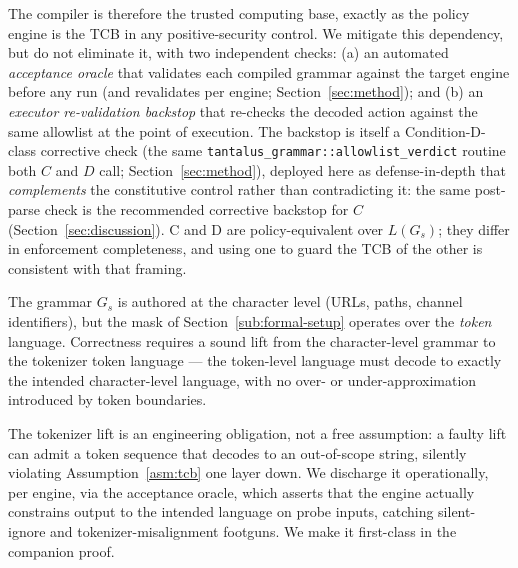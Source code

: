 The compiler is therefore the trusted computing base, exactly as the policy engine is the TCB in any positive-security control. We mitigate this dependency, but do not eliminate it, with two independent checks: (a) an automated \emph{acceptance oracle} that validates each compiled grammar against the target engine before any run (and revalidates per engine; Section~\ref{sec:method}); and (b) an \emph{executor re-validation backstop} that re-checks the decoded action against the same allowlist at the point of execution. The backstop is itself a Condition-D-class corrective check (the same \texttt{tantalus\_grammar::allowlist\_verdict} routine both \(C\) and \(D\) call; Section~\ref{sec:method}), deployed here as defense-in-depth that \emph{complements} the constitutive control rather than contradicting it: the same post-parse check is the recommended corrective backstop for \(C\) (Section~\ref{sec:discussion}). C and D are policy-equivalent over \(L(G_s)\); they differ in enforcement completeness, and using one to guard the TCB of the other is consistent with that framing.

\begin{assumption}
\label{asm:tokenizer-lift}
The grammar \(G_s\) is authored at the character level (URLs, paths, channel identifiers), but the mask of Section~\ref{sub:formal-setup} operates over the \emph{token} language. Correctness requires a sound lift from the character-level grammar to the tokenizer token language --- the token-level language must decode to exactly the intended character-level language, with no over- or under-approximation introduced by token boundaries.
\end{assumption}

The tokenizer lift is an engineering obligation, not a free assumption: a faulty lift can admit a token sequence that decodes to an out-of-scope string, silently violating Assumption~\ref{asm:tcb} one layer down. We discharge it operationally, per engine, via the acceptance oracle, which asserts that the engine actually constrains output to the intended language on probe inputs, catching silent-ignore and tokenizer-misalignment footguns. We make it first-class in the companion proof.

